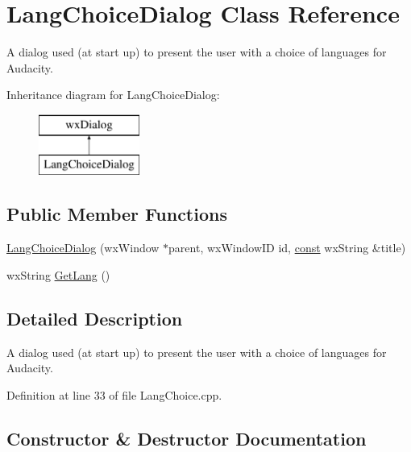 \hypertarget{class_lang_choice_dialog}{}\section{Lang\+Choice\+Dialog Class Reference}
\label{class_lang_choice_dialog}


A dialog used (at start up) to present the user with a choice of languages for Audacity.  


Inheritance diagram for Lang\+Choice\+Dialog\+:\begin{figure}[H]
\begin{center}
\leavevmode
\includegraphics[height=2.000000cm]{class_lang_choice_dialog}
\end{center}
\end{figure}
\subsection*{Public Member Functions}
\begin{DoxyCompactItemize}
\item 
\hyperlink{class_lang_choice_dialog_a3c941b710f12f7b1b2492eed23b80fcf}{Lang\+Choice\+Dialog} (wx\+Window $\ast$parent, wx\+Window\+ID id, \hyperlink{getopt1_8c_a2c212835823e3c54a8ab6d95c652660e}{const} wx\+String \&title)
\item 
wx\+String \hyperlink{class_lang_choice_dialog_ae2a6d0666ca59c4fc1f02724ae9480ba}{Get\+Lang} ()
\end{DoxyCompactItemize}


\subsection{Detailed Description}
A dialog used (at start up) to present the user with a choice of languages for Audacity. 

Definition at line 33 of file Lang\+Choice.\+cpp.



\subsection{Constructor \& Destructor Documentation}

